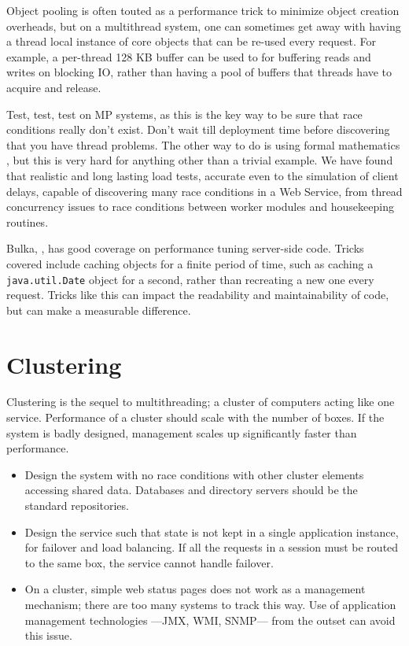 \documentclass[draft]{report}
\begin{document}
Object pooling is often touted as a performance trick to minimize object
creation overheads, but on a multithread system, one can sometimes get
away with having a thread local instance of core objects that can be
re-used every request. For example, a per-thread 128 KB buffer can be
used to for buffering reads and writes on blocking IO, rather than
having a pool of buffers that threads have to acquire and release.

Test, test, test on MP systems, as this is the key way to be sure that
race conditions really don't exist. Don't wait till deployment time
before discovering that you have thread problems. The other way to do is
using formal mathematics \cite{milner:ccs}, but this is very hard for
anything other than a trivial example. We have found that realistic and
long lasting load tests, accurate even to the simulation of client
delays, capable of discovering many race conditions in a Web Service,
from thread concurrency issues to race conditions between worker modules
and housekeeping routines.

Bulka, \cite{bulka:performance}, has good coverage on performance tuning
server-side code. Tricks covered include caching objects for a finite
period of time, such as caching a \verb|java.util.Date| object for a
second, rather than recreating a new one every request. Tricks like this
can impact the readability and maintainability of code, but can make a
measurable difference.

\section{Clustering}

Clustering is the sequel to multithreading; a cluster of computers
acting like one service. Performance of a cluster should scale with the
number of boxes. If the system is badly designed, management scales up
significantly faster than performance.

\begin{itemize}

\item

Design the system with no race conditions with other cluster elements
accessing shared data. Databases and directory servers should be the
standard repositories.

\item

Design the service such that state is not kept in a single application
instance, for failover and load balancing. If all the requests in a
session must be routed to the same box, the service cannot handle
failover.

\item

On a cluster, simple web status pages does not work as a management
mechanism; there are too many systems to track this way. Use of
application management technologies ---JMX, WMI, SNMP--- from the outset
can avoid this issue.

\end{itemize}
\end{document}
